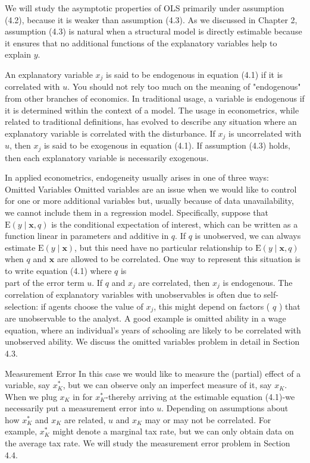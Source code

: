 \documentclass[10pt]{article}
\begin{document}
We will study the asymptotic properties of OLS primarily under assumption (4.2), because it is weaker than assumption (4.3). As we discussed in Chapter 2, assumption (4.3) is natural when a structural model is directly estimable because it ensures that no additional functions of the explanatory variables help to explain $y$.

An explanatory variable $x_{j}$ is said to be endogenous in equation (4.1) if it is correlated with $u$. You should not rely too much on the meaning of "endogenous" from other branches of economics. In traditional usage, a variable is endogenous if it is determined within the context of a model. The usage in econometrics, while related to traditional definitions, has evolved to describe any situation where an explanatory variable is correlated with the disturbance. If $x_{j}$ is uncorrelated with $u$, then $x_{j}$ is said to be exogenous in equation (4.1). If assumption (4.3) holds, then each explanatory variable is necessarily exogenous.

In applied econometrics, endogeneity usually arises in one of three ways:\\
Omitted Variables Omitted variables are an issue when we would like to control for one or more additional variables but, usually because of data unavailability, we cannot include them in a regression model. Specifically, suppose that $\mathrm{E}(y \mid \mathbf{x}, q)$ is the conditional expectation of interest, which can be written as a function linear in parameters and additive in $q$. If $q$ is unobserved, we can always estimate $\mathrm{E}(y \mid \mathbf{x})$, but this need have no particular relationship to $\mathrm{E}(y \mid \mathbf{x}, q)$ when $q$ and $\mathbf{x}$ are allowed to be correlated. One way to represent this situation is to write equation (4.1) where $q$ is\\
part of the error term $u$. If $q$ and $x_{j}$ are correlated, then $x_{j}$ is endogenous. The correlation of explanatory variables with unobservables is often due to self-selection: if agents choose the value of $x_{j}$, this might depend on factors ( $q$ ) that are unobservable to the analyst. A good example is omitted ability in a wage equation, where an individual's years of schooling are likely to be correlated with unobserved ability. We discuss the omitted variables problem in detail in Section 4.3.

Measurement Error In this case we would like to measure the (partial) effect of a variable, say $x_{K}^{*}$, but we can observe only an imperfect measure of it, say $x_{K}$. When we plug $x_{K}$ in for $x_{K}^{*}$-thereby arriving at the estimable equation (4.1)-we necessarily put a measurement error into $u$. Depending on assumptions about how $x_{K}^{*}$ and $x_{K}$ are related, $u$ and $x_{K}$ may or may not be correlated. For example, $x_{K}^{*}$ might denote a marginal tax rate, but we can only obtain data on the average tax rate. We will study the measurement error problem in Section 4.4.
\end{document}
